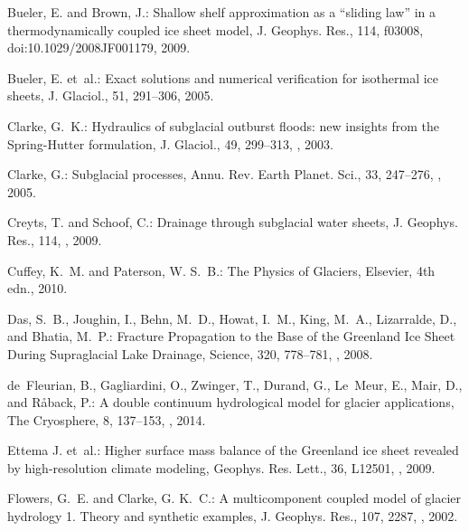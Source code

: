 \documentclass[gmd]{copernicus}   %
\begin{document}
\begin{thebibliography}{}
Bueler, E. and Brown, J.: Shallow shelf approximation as a ``sliding law'' in a
  thermodynamically coupled ice sheet model, J. Geophys. Res., 114, f03008,
  doi:10.1029/2008JF001179, 2009.

Bueler, E. et~al.: Exact solutions and numerical verification for isothermal ice sheets,
  J. Glaciol., 51, 291--306, 2005.

Clarke, G.~K.: Hydraulics of subglacial outburst floods: new insights from the
  {Spring-Hutter} formulation, J. Glaciol., 49, 299--313,
  , 2003.

Clarke, G.: Subglacial processes, Annu. Rev. Earth Planet. Sci., 33,
  247--276, , 2005.

Creyts, T. and Schoof, C.: Drainage through subglacial water sheets, J.
  Geophys. Res., 114, , 2009.

Cuffey, K.~M. and Paterson, W. S.~B.: The {P}hysics of {G}laciers, Elsevier,
  4th edn., 2010.

Das, S.~B., Joughin, I., Behn, M.~D., Howat, I.~M., King, M.~A., Lizarralde,
  D., and Bhatia, M.~P.: {Fracture Propagation to the Base of the Greenland Ice
  Sheet During Supraglacial Lake Drainage}, Science, 320, 778--781,
  , 2008.

de~Fleurian, B., Gagliardini, O., Zwinger, T., Durand, G., Le~Meur, E., Mair,
  D., and R{\aa}back, P.: A double continuum hydrological model for glacier
  applications, The Cryosphere, 8, 137--153, , 2014.

Ettema J. et~al.: Higher surface mass balance of the Greenland ice sheet
  revealed by high-resolution climate modeling, Geophys. Res. Lett., 36, L12501,
  , 2009.

Flowers, G.~E. and Clarke, G. K.~C.: A multicomponent coupled model of glacier
  hydrology 1. {T}heory and synthetic examples, J. Geophys. Res., 107, 2287,
  , 2002{}.


\end{thebibliography}
\end{document}
